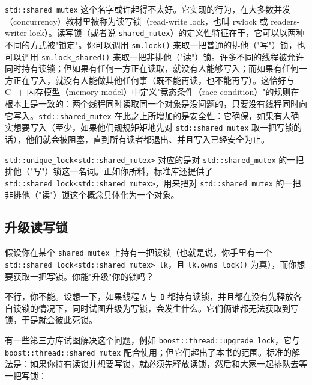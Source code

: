 \texttt{std::\allowbreak{}shared\_\allowbreak{}mutex} 这个名字或许起得不太好。它实现的行为，在大多数并发（concurrency）教材里被称为读写锁（read-write lock，也叫 rwlock 或 readers-writer lock）。读写锁（或者说 \texttt{shared\_\allowbreak{}mutex}）的定义性特征在于，它可以以两种不同的方式被"锁定"。你可以调用 \texttt{sm.\allowbreak{}lock(\allowbreak{})\allowbreak{}} 来取一把普通的排他（"写"）锁，也可以调用 \texttt{sm.\allowbreak{}lock\_\allowbreak{}shared(\allowbreak{})\allowbreak{}} 来取一把非排他（"读"）锁。许多不同的线程被允许同时持有读锁；但如果有任何一方正在读取，就没有人能够写入；而如果有任何一方正在写入，就没有人能做其他任何事（既不能再读，也不能再写）。这恰好与 C++ 内存模型（memory model）中定义"竞态条件（race condition）"的规则在根本上是一致的：两个线程同时读取同一个对象是没问题的，只要没有线程同时向它写入。\texttt{std::\allowbreak{}shared\_\allowbreak{}mutex} 在此之上所增加的是安全性：它确保，如果有人确实想要写入（至少，如果他们规规矩矩地先对 \texttt{std::\allowbreak{}shared\_\allowbreak{}mutex} 取一把写锁的话），他们就会被阻塞，直到所有读者都退出、并且写入已经安全为止。

\texttt{std::\allowbreak{}unique\_\allowbreak{}lock<\allowbreak{}std::\allowbreak{}shared\_\allowbreak{}mutex>\allowbreak{}} 对应的是对 \texttt{std::\allowbreak{}shared\_\allowbreak{}mutex} 的一把排他（"写"）锁这一名词。正如你所料，标准库还提供了 \texttt{std::\allowbreak{}shared\_\allowbreak{}lock<\allowbreak{}std::\allowbreak{}shared\_\allowbreak{}mutex>\allowbreak{}}，用来把对 \texttt{std::\allowbreak{}shared\_\allowbreak{}mutex} 的一把非排他（"读"）锁这个概念具体化为一个对象。

\subsection{升级读写锁}

假设你在某个 \texttt{shared\_\allowbreak{}mutex} 上持有一把读锁（也就是说，你手里有一个 \texttt{std::\allowbreak{}shared\_\allowbreak{}lock<\allowbreak{}std::\allowbreak{}shared\_\allowbreak{}mutex>\allowbreak{} lk}，且 \texttt{lk.\allowbreak{}owns\_\allowbreak{}lock(\allowbreak{})\allowbreak{}} 为真），而你想要获取一把写锁。你能"升级"你的锁吗？

不行，你不能。设想一下，如果线程 \texttt{A} 与 \texttt{B} 都持有读锁，并且都在没有先释放各自读锁的情况下，同时试图升级为写锁，会发生什么。它们俩谁都无法获取到写锁，于是就会彼此死锁。

有一些第三方库试图解决这个问题，例如 \texttt{boost::\allowbreak{}thread::\allowbreak{}upgrade\_\allowbreak{}lock}，它与 \texttt{boost::\allowbreak{}thread::\allowbreak{}shared\_\allowbreak{}mutex} 配合使用；但它们超出了本书的范围。标准的解法是：如果你持有读锁并想要写锁，就必须先释放读锁，然后和大家一起排队去等一把写锁：

